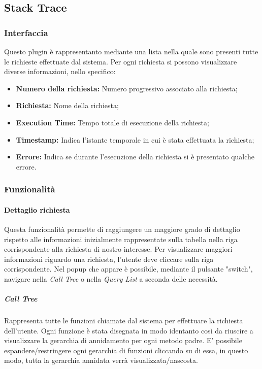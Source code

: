 \subsection{Stack Trace}
\label{sec:strace}
\subsubsection{Interfaccia}
Questo plugin è rappresentanto mediante una lista nella quale sono presenti tutte le richieste effettuate dal sistema. Per ogni richiesta si possono visualizzare diverse informazioni, nello specifico:
   
    \begin{itemize}
    	
    	\item \textbf{Numero della richiesta:} Numero progressivo associato alla richiesta;
    	\item \textbf{Richiesta:} Nome della richiesta;
    	\item \textbf{Execution Time:} Tempo totale di esecuzione della richiesta;
    	\item \textbf{Timestamp:} Indica l'istante temporale in cui è stata effettuata la richiesta;
    	\item \textbf{Errore:} Indica se durante l'esecuzione della richiesta si è presentato qualche errore.
    	
    	\end{itemize}

\subsubsection{Funzionalità}
\paragraph {Dettaglio richiesta} \Spazio
Questa funzionalità permette di raggiungere un maggiore grado di dettaglio rispetto alle informazioni inizialmente rappresentate sulla tabella nella riga corrispondente alla richiesta di nostro interesse.
Per visualizzare maggiori informazioni riguardo una richiesta, l'utente deve cliccare sulla riga corrispondente.
Nel popup che appare è possibile, mediante il pulsante "switch", navigare nella \emph{Call Tree} o nella \emph{Query List} a seconda delle necessità.

\subparagraph {Call Tree} \Spazio
Rappresenta tutte le funzioni chiamate dal sistema per effettuare la richiesta dell'utente.
Ogni funzione è stata disegnata in modo identanto così da riuscire a visualizzare la gerarchia di annidamento per ogni metodo padre.
E' possibile espandere/restringere ogni gerarchia di funzioni cliccando su di essa, in questo modo, tutta la gerarchia annidata verrà visualizzata/nascosta.

